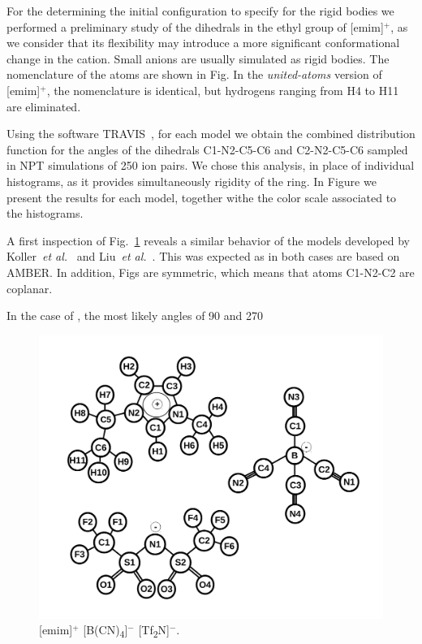 \documentclass[3p,twocolumn]{elsarticle}
\begin{document}
For the determining the initial configuration to specify for the rigid bodies we performed a preliminary study of the dihedrals in the ethyl group of [emim]$^{+}$, as we consider that its flexibility  may introduce a more significant conformational change in the cation. Small anions are usually simulated as rigid bodies. The nomenclature of the atoms are shown in Fig. In the \textit{united-atoms} version of [emim]$^{+}$,  the nomenclature is identical, but hydrogens ranging from H4 to H11 are eliminated.

Using the software TRAVIS~\cite{Brehm_2011}, for each model we obtain the combined distribution function for the angles of the dihedrals C1-N2-C5-C6 and C2-N2-C5-C6 sampled in NPT simulations of 250 ion pairs. We chose this analysis, in place of individual histograms, as it provides simultaneously rigidity of the ring. In Figure we present the results for each model, together withe the color scale associated to the histograms.

A first inspection of Fig.~\ref{fig:atoms_id} reveals a similar behavior of the models developed by Koller~\textit{et al.}~\cite{Koller_2012} and Liu~\textit{et al.}~\cite{Liu_2014}. This was expected as in both cases are based on AMBER. In addition, Figs are symmetric, which means that atoms C1-N2-C2 are coplanar.

In the case of , the most likely angles of 90 and 270 

\begin{figure}[H]
\centering
\includegraphics[width=\linewidth]{ions_paper.pdf}
\caption{[emim]$^{+}$ [B(CN)\textsubscript{4}]$^{-}$ [Tf\textsubscript{2}N]$^{-}$.}
\label{fig:atoms_id}
\end{figure}
\end{document}
